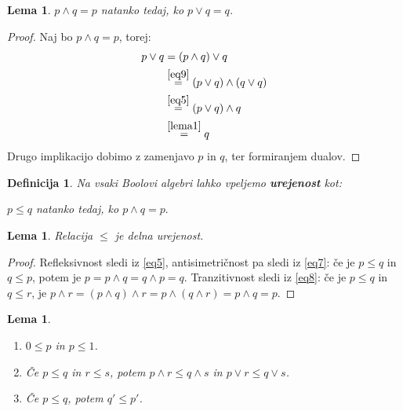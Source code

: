 \documentclass{amsart}
\newtheorem{lema}[izrek]{Lema}
\newtheorem{definicija}[izrek]{Definicija}
\begin{document}
\begin{lema}
    \label{lema2}
    \(p \wedge q = p\) natanko tedaj, ko \(p \vee q = q\).
\end{lema}

\begin{proof}
    Naj bo \(p \wedge q = p\), torej: 
    \begin{align*}
        p \vee q &\stackrel{}{=} \left(p \wedge q\right) \vee q \\
                    &\stackrel{\eqref{eq9}}{=} \left(p \vee q\right) \wedge \left(q \vee q\right) \\
                    &\stackrel{\eqref{eq5}}{=} \left(p \vee q\right) \wedge q\\
                    &\stackrel{\ref{lema1}}{=} q 
    \end{align*}
    Drugo implikacijo dobimo z zamenjavo $p$ in $q$, ter formiranjem dualov.
\end{proof}

\begin{definicija}
    Na vsaki Boolovi algebri lahko vpeljemo \textbf{urejenost} kot:
    \begin{center}
        \(p \leq q \) natanko tedaj, ko \(p \wedge q  = p.\)
    \end{center}
\end{definicija}

\begin{lema}
    Relacija \(\leq\) je delna urejenost.
\end{lema}

\begin{proof}
    Refleksivnost sledi iz \eqref{eq5}, antisimetričnost pa sledi iz \eqref{eq7}: če je \(p \leq q\) in \(q \leq p\), potem
    je \(p = p \wedge q = q \wedge p = q\). Tranzitivnost sledi iz \eqref{eq8}:
    če je \(p \leq q\) in \(q \leq r\), je \(p\wedge r = \left(p \wedge q\right) \wedge r = p \wedge \left(q \wedge r\right) = p \wedge q = p\).
\end{proof}

\begin{lema}
    \label{lema3}
    \begin{enumerate}
        \item \(0 \leq p\) in \(p \leq 1\).
        \item Če \(p \leq q\) in \(r \leq s\), potem \(p \wedge r \leq q \wedge s\) in \(p \vee r \leq q \vee s\). \label{lema3.2}
        \item Če \(p \leq q\), potem \(q' \leq p'\).
    \end{enumerate}
\end{lema}
\end{document}
